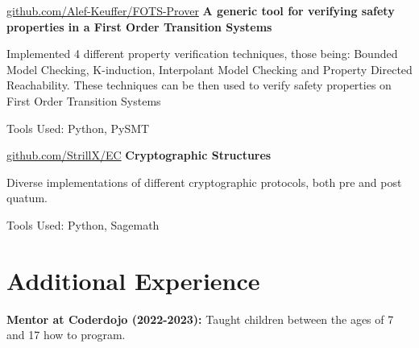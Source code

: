 \documentclass[10pt, letterpaper]{article}
\begin{document}
        
        \begin{twocolentry}{
            \href{https://github.com/Alef-Keuffer/FOTS-Prover}{github.com/Alef-Keuffer/FOTS-Prover}
        }
            \textbf{A generic tool for verifying safety properties in a First Order Transition Systems}\end{twocolentry}

        \vspace{0.10 cm}
        \begin{onecolentry}
            \begin{highlights}
                \item Implemented 4 different property verification techniques, those being: Bounded Model Checking, K-induction, Interpolant Model Checking and Property Directed Reachability. These techniques can be then used to verify safety properties on First Order Transition Systems
                \item Tools Used: Python, PySMT
            \end{highlights}
        \end{onecolentry}


        \vspace{0.2 cm}

        \begin{twocolentry}{
            \href{https://github.com/StrillX/EC}{github.com/StrillX/EC}
        }
            \textbf{Cryptographic Structures}\end{twocolentry}

        \vspace{0.10 cm}
        \begin{onecolentry}
            \begin{highlights}
                \item Diverse implementations of different cryptographic protocols, both pre and post quatum.
                \item Tools Used: Python, Sagemath
            \end{highlights}
        \end{onecolentry}


    
    \section{Additional Experience}



        
        \begin{onecolentry}
            \textbf{Mentor at Coderdojo (2022-2023):} Taught children between the ages of 7 and 17 how to program.
        \end{onecolentry}
    
\end{document}
